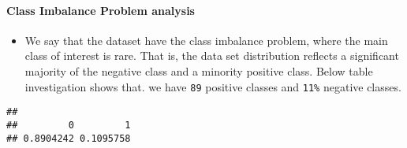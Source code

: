 \documentclass[
]{article}
\newenvironment{Shaded}{\begin{snugshade}}{\end{snugshade}}
\newcommand{\KeywordTok}[1]{\textcolor[rgb]{0.13,0.29,0.53}{\textbf{#1}}}
\newcommand{\NormalTok}[1]{#1}
\newcommand{\OperatorTok}[1]{\textcolor[rgb]{0.81,0.36,0.00}{\textbf{#1}}}
\providecommand{\tightlist}{%
  \setlength{\itemsep}{0pt}\setlength{\parskip}{0pt}}
\begin{document}
\hypertarget{class-imbalance-problem-analysis}{%
\paragraph{Class Imbalance Problem
analysis}\label{class-imbalance-problem-analysis}}

\begin{itemize}
\tightlist
\item
  We say that the dataset have the class imbalance problem, where the
  main class of interest is rare. That is, the data set distribution
  reflects a significant majority of the negative class and a minority
  positive class. Below table investigation shows that. we have
  \texttt{89} positive classes and \texttt{11\%} negative classes.
\end{itemize}

\begin{Shaded}
\end{Shaded}

\begin{verbatim}
## 
##         0         1 
## 0.8904242 0.1095758
\end{verbatim}
\end{document}

